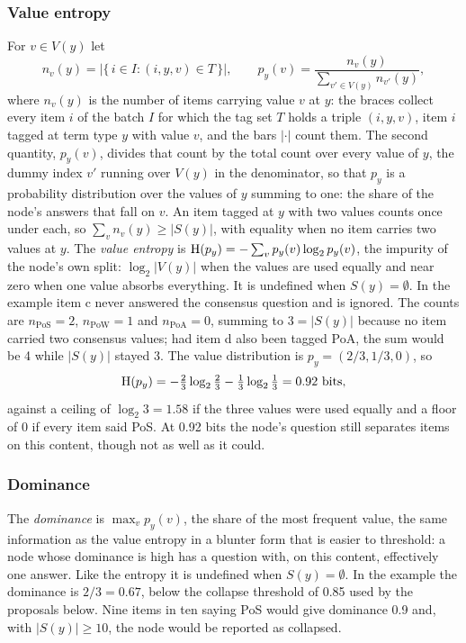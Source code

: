 \subsubsection{Value entropy}
For $v \in V(y)$ let
\begin{equation}
  \label{eq:valcount}
  n_v(y) = |\{\, i \in I : (i, y, v) \in T \,\}|, \qquad
  p_y(v) = \frac{n_v(y)}{\sum_{v' \in V(y)} n_{v'}(y)},
\end{equation}
where $n_v(y)$ is the number of items carrying value $v$ at $y$: the braces
collect every item $i$ of the batch $I$ for which the tag set $T$ holds a
triple $(i, y, v)$, item $i$ tagged at term type $y$ with value $v$, and the
bars $|\cdot|$ count them. The second quantity, $p_y(v)$, divides that count
by the total count over every value of $y$, the dummy index $v'$ running over
$V(y)$ in the denominator, so that $p_y$ is a probability distribution over
the values of $y$ summing to one: the share of the node's answers that fall
on $v$. An item tagged at $y$ with two values counts once under each, so
$\sum_v n_v(y) \ge |S(y)|$, with equality when no item carries two values
at $y$. The \emph{value entropy} is
$\operatorname{H}(p_y) = -\sum_{v} p_y(v) \log_2 p_y(v)$, the impurity of the node's
own split: $\log_2 |V(y)|$ when the values are used equally and near zero
when one value absorbs everything. It is undefined when $S(y) = \emptyset$.
In the example item c never answered the consensus question and is ignored.
The counts are $n_{\mathrm{PoS}} = 2$, $n_{\mathrm{PoW}} = 1$ and
$n_{\mathrm{PoA}} = 0$, summing to $3 = |S(y)|$ because no item carried two
consensus values; had item d also been tagged PoA, the sum would be 4 while
$|S(y)|$ stayed 3. The value distribution is $p_y = (2/3, 1/3, 0)$, so
\begin{equation*}
  \operatorname{H}(p_y) = -\tfrac{2}{3}\log_2\tfrac{2}{3} - \tfrac{1}{3}\log_2\tfrac{1}{3} = 0.92 \text{ bits},
\end{equation*}
against a ceiling of $\log_2 3 = 1.58$ if the three values were used
equally and a floor of 0 if every item said PoS. At 0.92 bits the node's
question still separates items on this content, though not as well as it
could.

\subsubsection{Dominance}
The \emph{dominance} is $\max_v p_y(v)$, the share of the most frequent
value, the same information as the value entropy in a blunter form that is
easier to threshold: a node whose dominance is high has a question with, on
this content, effectively one answer. Like the entropy it is undefined when
$S(y) = \emptyset$. In the example the dominance is $2/3 = 0.67$, below the
collapse threshold of 0.85 used by the proposals below. Nine items in ten
saying PoS would give dominance 0.9 and, with $|S(y)| \ge 10$, the node
would be reported as collapsed.

